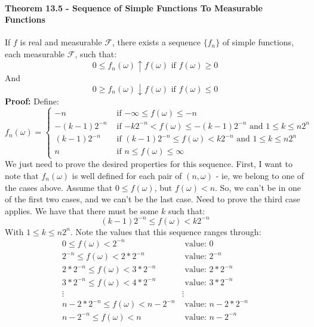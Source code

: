 \documentclass[12pt,a4paper]{article}
\newcommand{\1}[1]{\mathbbm{1}\left\{ #1 \right\}}
\newcommand{\fcal}{\mathcal{F}}
\begin{document}
\paragraph{Theorem 13.5 - Sequence of Simple Functions To Measurable Functions} If $f$ is real and measurable $\fcal$, there exists a sequence $\{f_n\}$ of simple functions, each measurable $\fcal$, such that:
$$
	0 \leq f_n(\omega) \uparrow f(\omega) \text{ if $f(\omega) \geq 0$}
$$
And
$$
	0 \geq f_n(\omega) \downarrow f(\omega) \text{ if $f(\omega) \leq 0$}
$$
\textbf{Proof:} Define:
$$
	f_n(\omega) = \begin{cases}
	-n & \text{ if $-\infty \leq f(\omega) \leq -n$}\\
	-(k-1)2^{-n} & \text{ if $-k2^{-n} < f(\omega) \leq -(k-1)2^{-n}$ and $1 \leq k \leq n2^n$}\\
	(k-1)2^{-n} & \text{ if $(k-1)2^{-n} \leq f(\omega) < k2^{-n}$ and $1 \leq k \leq n2^n$}\\
	n& \text{ if $n \leq f(\omega) \leq \infty$}
	\end{cases}
$$
We just need to prove the desired properties for this sequence. First, I want to note that $f_n(\omega)$ is well defined for each pair of $(n,\omega)$ - ie, we belong to one of the cases above. Assume that $0 \leq f(\omega)$, but $f(\omega) < n$. So, we can't be in one of the first two cases, and we can't be the last case. Need to prove the third case applies. We have that there must be some $k$ such that:
$$
	(k-1)2^{-n} \leq f(\omega) < k2^{-n}
$$
With $1 \leq k \leq n2^n$. Note the values that this sequence ranges through:
\begin{align*}
	0 \leq f(\omega) < 2^{-n} & \text{ value: } 0\\
	2^{-n} \leq f(\omega) < 2 * 2^{-n} & \text{ value: } 2^{-n}\\
	2 * 2^{-n} \leq f(\omega) < 3 * 2^{-n} & \text{ value: } 2*2^{-n}\\
	3 * 2^{-n} \leq f(\omega) < 4 * 2^{-n} & \text{ value: } 3*2^{-n}\\
	\vdots & \vdots\\
	n - 2 * 2^{-n} \leq f(\omega) < n - 2^{-n}& \text{ value: } n - 2 * 2^{-n}\\
	n - 2^{-n} \leq f(\omega) < n& \text{ value: } n - 2^{-n}\\
\end{align*}
\end{document}
